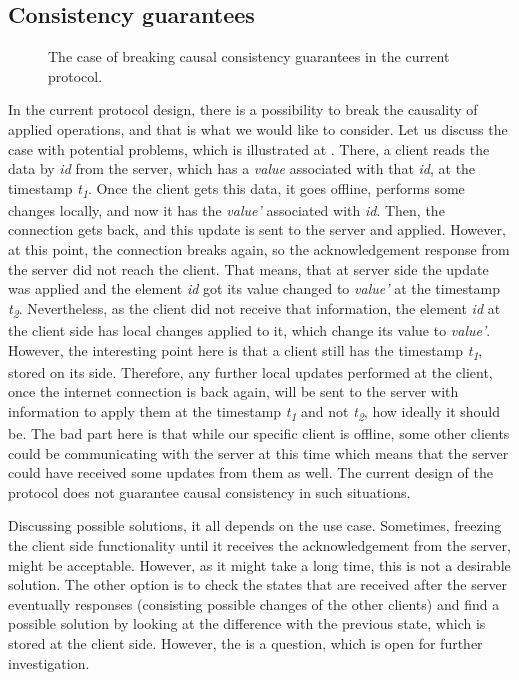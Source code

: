 \subsection*{Consistency guarantees}

\begin{figure}[!htb]
    \begin{center}
    \def\svgwidth{\linewidth}
    
    \caption {The case of breaking causal consistency guarantees in the current protocol.}
    \label{fig:final}
\end{center}
\end{figure}

In the current protocol design, there is a possibility to break the causality of applied operations, and that is what we would like to consider. Let us discuss the case with potential problems, which is illustrated at . There, a client reads the data by \textit{id} from the server, which has a \textit{value} associated with that \textit{id}, at the timestamp \textit{t\textsubscript{1}}. Once the client gets this data, it goes offline, performs some changes locally, and now it has the \textit{value'} associated with \textit{id}. Then, the connection gets back, and this update is sent to the server and applied. However, at this point, the connection breaks again, so the acknowledgement response from the server did not reach the client. That means, that at server side the update was applied and the element \textit{id} got its value changed to \textit{value'} at the timestamp \textit{t\textsubscript{2}}. Nevertheless, as the client did not receive that information, the element \textit{id} at the client side has local changes applied to it, which change its value to \textit{value'}. However, the interesting point here is that a client still has the timestamp \textit{t\textsubscript{1}}, stored on its side. Therefore, any further local updates performed at the client, once the internet connection is back again, will be sent to the server with information to apply them at the timestamp \textit{t\textsubscript{1}} and not \textit{t\textsubscript{2}}, how ideally it should be. The bad part here is that while our specific client is offline, some other clients could be communicating with the server at this time which means that the server could have received some updates from them as well. The current design of the protocol does not guarantee causal consistency in such situations. 

Discussing possible solutions, it all depends on the use case. Sometimes, freezing the client side functionality until it receives the acknowledgement from the server, might be acceptable. However, as it might take a long time, this is not a desirable solution. The other option is to check the states that are received after the server eventually responses (consisting possible changes of the other clients) and find a possible solution by looking at the difference with the previous state, which is stored at the client side. However, the is a question, which is open for further investigation.